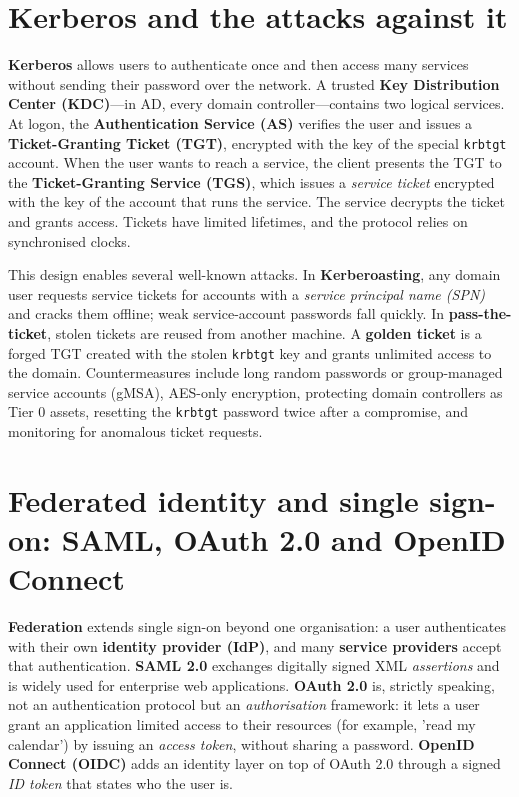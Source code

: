 \section{Kerberos and the attacks against it}\label{sec:8.5}
\textbf{Kerberos} allows users to authenticate once and then access many services without sending their password over the network. A trusted \textbf{Key Distribution Center (KDC)}—in AD, every domain controller—contains two logical services. At logon, the \textbf{Authentication Service (AS)} verifies the user and issues a \textbf{Ticket-Granting Ticket (TGT)}, encrypted with the key of the special \texttt{krbtgt} account. When the user wants to reach a service, the client presents the TGT to the \textbf{Ticket-Granting Service (TGS)}, which issues a \emph{service ticket} encrypted with the key of the account that runs the service. The service decrypts the ticket and grants access. Tickets have limited lifetimes, and the protocol relies on synchronised clocks.

This design enables several well-known attacks. In \textbf{Kerberoasting}, any domain user requests service tickets for accounts with a \emph{service principal name (SPN)} and cracks them offline; weak service-account passwords fall quickly. In \textbf{pass-the-ticket}, stolen tickets are reused from another machine. A \textbf{golden ticket} is a forged TGT created with the stolen \texttt{krbtgt} key and grants unlimited access to the domain. Countermeasures include long random passwords or group-managed service accounts (gMSA), AES-only encryption, protecting domain controllers as Tier 0 assets, resetting the \texttt{krbtgt} password twice after a compromise, and monitoring for anomalous ticket requests.

\section{Federated identity and single sign-on: SAML, OAuth 2.0 and OpenID Connect}\label{sec:8.6}
\textbf{Federation} extends single sign-on beyond one organisation: a user authenticates with their own \textbf{identity provider (IdP)}, and many \textbf{service providers} accept that authentication. \textbf{SAML 2.0} exchanges digitally signed XML \emph{assertions} and is widely used for enterprise web applications. \textbf{OAuth 2.0} is, strictly speaking, not an authentication protocol but an \emph{authorisation} framework: it lets a user grant an application limited access to their resources (for example, 'read my calendar') by issuing an \emph{access token}, without sharing a password. \textbf{OpenID Connect (OIDC)} adds an identity layer on top of OAuth 2.0 through a signed \emph{ID token} that states who the user is.

